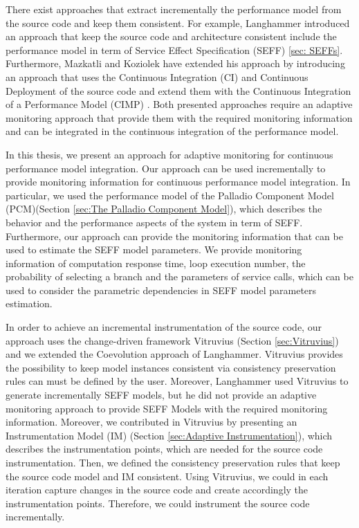 There exist approaches that extract incrementally the performance model from the source code and keep them consistent. For example, Langhammer introduced an approach \cite{langhammer2017automated} that keep the source code and architecture consistent include the performance model in term of Service Effect Specification (SEFF) \ref{sec: SEFFs}. Furthermore, Mazkatli and Koziolek have extended his approach by introducing an approach that uses the Continuous Integration (CI) and Continuous Deployment of the source code and extend them with the Continuous Integration of a Performance Model (CIMP) \cite{mazkatli2018continuous}. Both presented approaches require an adaptive monitoring approach that provide them with the required monitoring information and can be integrated in the continuous integration of the performance model. 

In this thesis, we present an approach for adaptive monitoring for continuous performance model integration. Our approach can be used incrementally to provide monitoring information for continuous performance model integration. In particular, we used the performance model of the Palladio Component Model (PCM)(Section \ref{sec:The Palladio Component Model}), which describes the behavior and the performance aspects of the system in term of SEFF. Furthermore, our approach can provide the monitoring information that can be used to estimate the SEFF model parameters. We provide monitoring information of computation response time, loop execution number, the probability of selecting a branch and the parameters of service calls, which can be used to consider the parametric dependencies in SEFF model parameters estimation.

In order to achieve an incremental instrumentation of the source code, our approach uses the change-driven framework Vitruvius (Section \ref{sec:Vitruvius}) and we extended the Coevolution approach \cite{langhammer2017automated} of Langhammer. Vitruvius provides the possibility to keep model instances consistent via consistency preservation rules can must be defined by the user. Moreover, Langhammer used Vitruvius to generate incrementally SEFF models, but he did not provide an adaptive monitoring approach to provide SEFF Models with the required monitoring information. Moreover, we contributed in Vitruvius by presenting an Instrumentation Model (IM) (Section \ref{sec:Adaptive Instrumentation}), which describes the instrumentation points, which are needed for the source code instrumentation. Then, we defined the consistency preservation rules that keep the source code model and IM consistent. Using Vitruvius, we could in each iteration capture changes in the source code and create accordingly the instrumentation points. Therefore, we could instrument the source code incrementally. 

